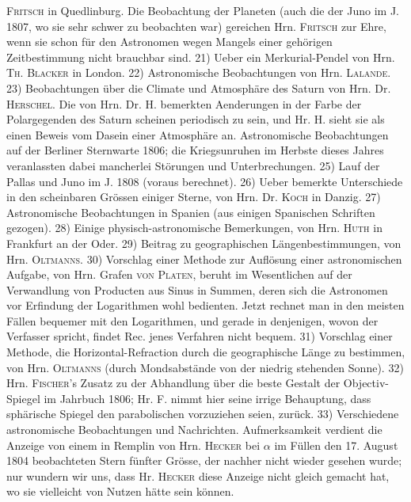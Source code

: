 \textsc{Fritsch} in Quedlinburg. Die Beobachtung der Planeten (auch die der Juno im J. 1807, wo sie sehr schwer zu beobachten war) gereichen Hrn. \textsc{Fritsch} zur Ehre, wenn sie schon für den Astronomen wegen Mangels einer gehörigen Zeitbestimmung nicht brauchbar sind. 21) Ueber ein Merkurial-Pendel von Hrn. \textsc{Th. Blacker} in London. 22) Astronomische Beobachtungen von Hrn. \textsc{Lalande}. 23) Beobachtungen über die Climate und Atmosphäre des Saturn von Hrn. Dr. \textsc{Herschel}. Die von Hrn. Dr. H. bemerkten Aenderungen in der Farbe der Polargegenden des Saturn scheinen periodisch zu sein, und Hr. H. sieht sie als einen Beweis vom Dasein einer Atmosphäre an. Astronomische Beobachtungen auf der Berliner Sternwarte 1806; die Kriegsunruhen im Herbste dieses Jahres veranlassten dabei mancherlei Störungen und Unterbrechungen. 25) Lauf der Pallas und Juno im J. 1808 (voraus berechnet). 26) Ueber bemerkte Unterschiede in den scheinbaren Grössen einiger Sterne, von Hrn. Dr. \textsc{Koch} in Danzig. 27) Astronomische Beobachtungen in Spanien (aus einigen Spanischen Schriften gezogen). 28) Einige physisch-astronomische Bemerkungen, von Hrn. \textsc{Huth} in Frankfurt an der Oder. 29) Beitrag zu geographischen Längenbestimmungen, von Hrn. \textsc{Oltmanns}. 30) Vorschlag einer Methode zur Auflösung einer astronomischen Aufgabe, von Hrn. Grafen \textsc{von Platen}, beruht im Wesentlichen auf der Verwandlung von Producten aus Sinus in Summen, deren sich die Astronomen vor Erfindung der Logarithmen wohl bedienten. Jetzt rechnet man in den meisten Fällen bequemer mit den Logarithmen, und gerade in denjenigen, wovon der Verfasser spricht, findet Rec. jenes Verfahren nicht bequem. 31) Vorschlag einer Methode, die Horizontal-Refraction durch die geographische Länge zu bestimmen, von Hrn. \textsc{Oltmanns} (durch Mondsabstände von der niedrig stehenden Sonne). 32) Hrn. \textsc{Fischer}'s Zusatz zu der Abhandlung über die beste Gestalt der Objectiv-Spiegel im Jahrbuch 1806; Hr. F. nimmt hier seine irrige Behauptung, dass sphärische Spiegel den parabolischen vorzuziehen seien, zurück. 33) Verschiedene astronomische Beobachtungen und Nachrichten. Aufmerksamkeit verdient die Anzeige von einem in Remplin von Hrn. \textsc{Hecker} bei $\alpha$ im Füllen den 17. August 1804 beobachteten Stern fünfter Grösse, der nachher nicht wieder gesehen wurde; nur wundern wir uns, dass Hr. \textsc{Hecker} diese Anzeige nicht gleich gemacht hat, wo sie vielleicht von Nutzen hätte sein können.
